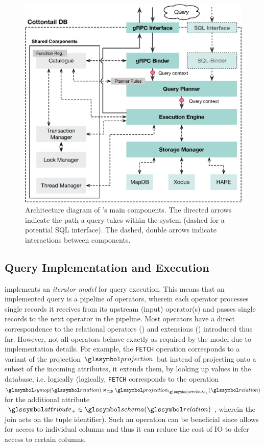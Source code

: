 \begin{figure}[bt]
    \centering
    \includegraphics[width=\textwidth]{figures/architecture.eps}
    \caption{Architecture diagram of \cottontail{}'s main components. The directed arrows indicate the path a query takes within the system (dashed for a potential SQL interface). The dashed, double arrows indicate interactions between components.}
    \label{figure:cottontail_architecture}
\end{figure}


\subsection{Query Implementation and Execution}

\cottontail{} implements an \emph{iterator model} for query execution. This means that an implemented query is a pipeline of operators, wherein each operator processes single records it receives from its upstream (input) operator(s) and passes single records to the next operator in the pipeline. Most operators have a direct correspondence to the relational operators () and extensions () introduced thus far. However, not all operators behave exactly as required by the model due to implementation details. For example, the \texttt{FETCH} operation corresponds to a variant of the projection $\projection$ but instead of projecting onto a subset of the incoming attributes, it extends them, by looking up values in the database, i.e. logically (logically, \texttt{FETCH} corresponds to the operation $\symop(\relation) \Join_{\mathtt{TID}} \projection_{\attribute_{+}}(\relation)$ for the additional attribute $\attribute_{+} \in \schema(\relation)$, wherein the join acts on the tuple identifier). Such an operation can be beneficial since \cottontail{} allows for access to individual columns and thus it can reduce the cost of IO to defer access to certain columns.

